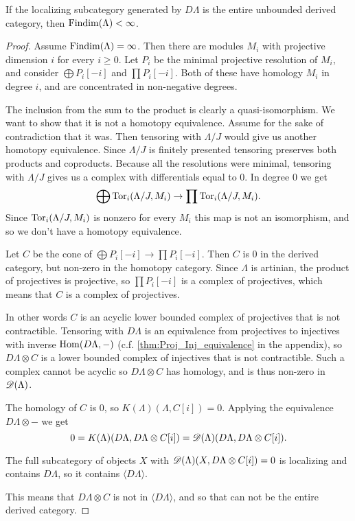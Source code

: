 \begin{theorem}\cite[Theorem~4.3]{Rick19}\label{thm:injectives_generate_implies_FDC}
	If the localizing subcategory generated by $D\Lambda$ is the entire unbounded derived category, then $\operatorname{Findim}(\Lambda) < \infty$.
	\begin{proof}
		Assume $\operatorname{Findim}(\Lambda) = \infty$. Then there are modules $M_i$ with projective dimension $i$ for every $i \geq 0$. Let $P_i$ be the minimal projective resolution of $M_i$, and consider $\bigoplus P_i[-i]$ and $\prod P_i[-i]$. Both of these have homology $M_i$ in degree $i$, and are concentrated in non-negative degrees.
		
		The inclusion from the sum to the product is clearly a quasi-isomorphism. We want to show that it is not a homotopy equivalence. Assume for the sake of contradiction that it was. Then tensoring with $\Lambda/J$ would give us another homotopy equivalence. Since $\Lambda/J$ is finitely presented tensoring preserves both products and coproducts. Because all the resolutions were minimal, tensoring with $\Lambda/J$ gives us a complex with differentials equal to 0. In degree 0 we get $$\bigoplus \operatorname{Tor}_i(\Lambda/J, M_i) \to \prod \operatorname{Tor}_i(\Lambda/J, M_i) .$$
		Since $\operatorname{Tor}_i(\Lambda/J, M_i)$ is nonzero for every $M_i$ this map is not an isomorphism, and so we don't have a homotopy equivalence.
		
		Let $C$ be the cone of $\bigoplus P_i[-i] \to \prod P_i[-i]$. Then $C$ is 0 in the derived category, but non-zero in the homotopy category. Since $\Lambda$ is artinian, the product of projectives is projective\cite[Theorem~3.3]{Chase60}, so $\prod P_i[-i]$ is a complex of projectives, which means that $C$ is a complex of projectives. 
		
		In other words $C$ is an acyclic lower bounded complex of projectives that is not contractible. Tensoring with $D\Lambda$ is an equivalence from projectives to injectives with inverse $\operatorname{Hom}(D\Lambda, -)$ (c.f. \cref{thm:Proj_Inj_equivalence} in the appendix), so $D\Lambda \otimes C$ is a lower bounded complex of injectives that is not contractible. Such a complex cannot be acyclic so $D\Lambda \otimes C$ has homology, and is thus non-zero in $\operatorname{\mathscr{D}}(\Lambda)$.
		
		The homology of $C$ is 0, so $K(\Lambda)(\Lambda, C[i]) = 0$. Applying the equivalence $D\Lambda \otimes -$ we get 
		$$0=K(\Lambda)(D\Lambda, D\Lambda \otimes C [i])=\operatorname{\mathscr{D}}(\Lambda)(D\Lambda, D\Lambda \otimes C [i]).$$ 
		
		The full subcategory of objects $X$ with $\operatorname{\mathscr{D}}(\Lambda)(X, D\Lambda \otimes C [i]) = 0$ is localizing and contains $D\Lambda$, so it contains $\langle D\Lambda \rangle$.
		
		This means that $D\Lambda \otimes C$ is not in $\langle D\Lambda \rangle$, and so that can not be the entire derived category.
	\end{proof}
\end{theorem}

